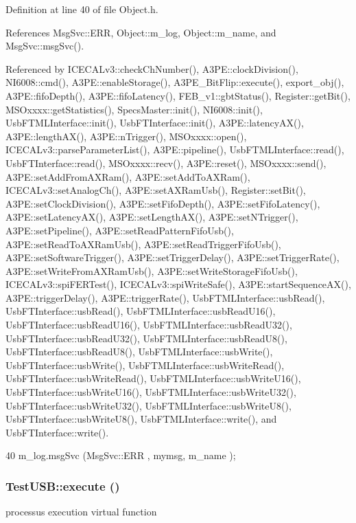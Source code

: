 Definition at line 40 of file Object.h.

References MsgSvc::ERR, Object::m\_\-log, Object::m\_\-name, and MsgSvc::msgSvc().

Referenced by ICECALv3::checkChNumber(), A3PE::clockDivision(), NI6008::cmd(), A3PE::enableStorage(), A3PE\_\-BitFlip::execute(), export\_\-obj(), A3PE::fifoDepth(), A3PE::fifoLatency(), FEB\_\-v1::gbtStatus(), Register::getBit(), MSOxxxx::getStatistics(), SpecsMaster::init(), NI6008::init(), UsbFTMLInterface::init(), UsbFTInterface::init(), A3PE::latencyAX(), A3PE::lengthAX(), A3PE::nTrigger(), MSOxxxx::open(), ICECALv3::parseParameterList(), A3PE::pipeline(), UsbFTMLInterface::read(), UsbFTInterface::read(), MSOxxxx::recv(), A3PE::reset(), MSOxxxx::send(), A3PE::setAddFromAXRam(), A3PE::setAddToAXRam(), ICECALv3::setAnalogCh(), A3PE::setAXRamUsb(), Register::setBit(), A3PE::setClockDivision(), A3PE::setFifoDepth(), A3PE::setFifoLatency(), A3PE::setLatencyAX(), A3PE::setLengthAX(), A3PE::setNTrigger(), A3PE::setPipeline(), A3PE::setReadPatternFifoUsb(), A3PE::setReadToAXRamUsb(), A3PE::setReadTriggerFifoUsb(), A3PE::setSoftwareTrigger(), A3PE::setTriggerDelay(), A3PE::setTriggerRate(), A3PE::setWriteFromAXRamUsb(), A3PE::setWriteStorageFifoUsb(), ICECALv3::spiFERTest(), ICECALv3::spiWriteSafe(), A3PE::startSequenceAX(), A3PE::triggerDelay(), A3PE::triggerRate(), UsbFTMLInterface::usbRead(), UsbFTInterface::usbRead(), UsbFTMLInterface::usbReadU16(), UsbFTInterface::usbReadU16(), UsbFTMLInterface::usbReadU32(), UsbFTInterface::usbReadU32(), UsbFTMLInterface::usbReadU8(), UsbFTInterface::usbReadU8(), UsbFTMLInterface::usbWrite(), UsbFTInterface::usbWrite(), UsbFTMLInterface::usbWriteRead(), UsbFTInterface::usbWriteRead(), UsbFTMLInterface::usbWriteU16(), UsbFTInterface::usbWriteU16(), UsbFTMLInterface::usbWriteU32(), UsbFTInterface::usbWriteU32(), UsbFTMLInterface::usbWriteU8(), UsbFTInterface::usbWriteU8(), UsbFTMLInterface::write(), and UsbFTInterface::write().


\begin{DoxyCode}
40 { m_log.msgSvc (MsgSvc::ERR     , mymsg, m_name ); }
\end{DoxyCode}
\hypertarget{classTestUSB_a8c3d68e00ec4f10ec638969756a925a8}{
\subsubsection[{execute}]{ TestUSB::execute ()}}
\label{classTestUSB_a8c3d68e00ec4f10ec638969756a925a8}
processus execution virtual function 

